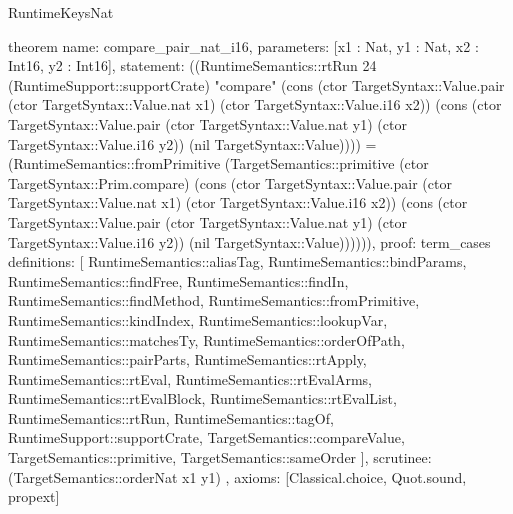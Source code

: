 \begin{lexlean}{RuntimeKeysNat}
\begin{semanticmodule}
theorem{
  name: compare_pair_nat_i16,
  parameters: [x1 : Nat, y1 : Nat, x2 : Int16, y2 : Int16],
  statement: ((RuntimeSemantics::rtRun 24 (RuntimeSupport::supportCrate) "compare" (cons (ctor TargetSyntax::Value.pair (ctor TargetSyntax::Value.nat x1) (ctor TargetSyntax::Value.i16 x2)) (cons (ctor TargetSyntax::Value.pair (ctor TargetSyntax::Value.nat y1) (ctor TargetSyntax::Value.i16 y2)) (nil TargetSyntax::Value)))) = (RuntimeSemantics::fromPrimitive (TargetSemantics::primitive (ctor TargetSyntax::Prim.compare) (cons (ctor TargetSyntax::Value.pair (ctor TargetSyntax::Value.nat x1) (ctor TargetSyntax::Value.i16 x2)) (cons (ctor TargetSyntax::Value.pair (ctor TargetSyntax::Value.nat y1) (ctor TargetSyntax::Value.i16 y2)) (nil TargetSyntax::Value)))))),
  proof: term_cases{
    definitions: [
      RuntimeSemantics::aliasTag,
      RuntimeSemantics::bindParams,
      RuntimeSemantics::findFree,
      RuntimeSemantics::findIn,
      RuntimeSemantics::findMethod,
      RuntimeSemantics::fromPrimitive,
      RuntimeSemantics::kindIndex,
      RuntimeSemantics::lookupVar,
      RuntimeSemantics::matchesTy,
      RuntimeSemantics::orderOfPath,
      RuntimeSemantics::pairParts,
      RuntimeSemantics::rtApply,
      RuntimeSemantics::rtEval,
      RuntimeSemantics::rtEvalArms,
      RuntimeSemantics::rtEvalBlock,
      RuntimeSemantics::rtEvalList,
      RuntimeSemantics::rtRun,
      RuntimeSemantics::tagOf,
      RuntimeSupport::supportCrate,
      TargetSemantics::compareValue,
      TargetSemantics::primitive,
      TargetSemantics::sameOrder
    ],
    scrutinee: (TargetSemantics::orderNat x1 y1)
  },
  axioms: [Classical.choice, Quot.sound, propext]
}


\end{semanticmodule}
\end{lexlean}
